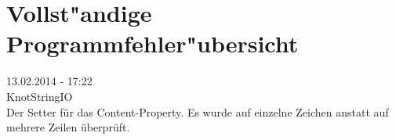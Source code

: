 %



\section{Vollst{"a}ndige Programmfehler{"u}bersicht}
\label{Anhang:Vollstaendige_Fehlerliste}




13.02.2014 - 17:22\\

KnotStringIO\\

Der Setter für das Content-Property.
Es wurde auf einzelne Zeichen anstatt auf mehrere Zeilen überprüft.



